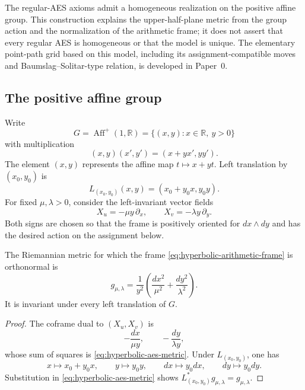 The regular-AES axioms admit a homogeneous realization on the positive affine
group.  This construction explains the upper-half-plane metric from the group
action and the normalization of the arithmetic frame; it does not assert that
every regular AES is homogeneous or that the model is unique.  The elementary
point-path grid based on this model, including its assignment-compatible moves
and Baumslag--Solitar-type relation, is developed in Paper~0.

\subsection{The positive affine group}

Write
\[
 G=\operatorname{Aff}^{+}(1,\mathbb R)
   =\{(x,y):x\in\mathbb R,\ y>0\}
\]
with multiplication
\begin{equation}\label{eq:positive-affine-group-law}
 (x,y)(x',y')=(x+yx',yy').
\end{equation}
The element \((x,y)\) represents the affine map \(t\mapsto x+yt\).
Left translation by \((x_0,y_0)\) is
\[
 L_{(x_0,y_0)}(x,y)=(x_0+y_0x,y_0y).
\]
For fixed \(\mu,\lambda>0\), consider the left-invariant vector fields
\begin{equation}\label{eq:hyperbolic-arithmetic-frame}
 X_u=-\mu y\,\partial_x,
 \qquad
 X_v=-\lambda y\,\partial_y .
\end{equation}
Both signs are chosen so that the frame is positively oriented for
\(dx\wedge dy\) and has the desired action on the assignment below.

\begin{proposition}\label{prop:invariant-affine-metric}
The Riemannian metric for which the frame
\eqref{eq:hyperbolic-arithmetic-frame} is orthonormal is
\begin{equation}\label{eq:hyperbolic-aes-metric}
 g_{\mu,\lambda}
 =\frac1{y^2}
  \left(\frac{dx^2}{\mu^2}+\frac{dy^2}{\lambda^2}\right).
\end{equation}
It is invariant under every left translation of \(G\).
\end{proposition}

\begin{proof}
The coframe dual to \((X_u,X_v)\) is
\[
 -\frac{dx}{\mu y},
 \qquad
 -\frac{dy}{\lambda y},
\]
whose sum of squares is \eqref{eq:hyperbolic-aes-metric}.  Under
\(L_{(x_0,y_0)}\), one has
\[
 x\longmapsto x_0+y_0x,\qquad
 y\longmapsto y_0y,\qquad
 dx\longmapsto y_0dx,\qquad
 dy\longmapsto y_0dy.
\]
Substitution in \eqref{eq:hyperbolic-aes-metric} shows
\(L_{(x_0,y_0)}^*g_{\mu,\lambda}=g_{\mu,\lambda}\).
\end{proof}

